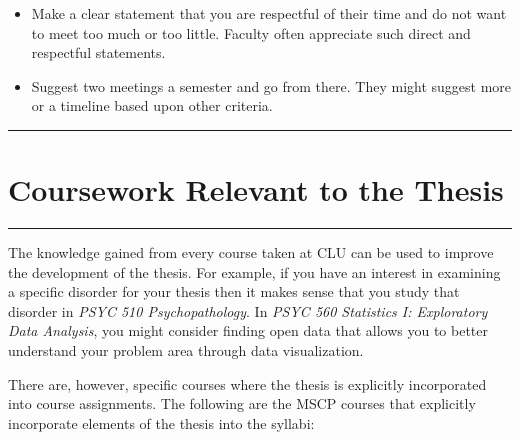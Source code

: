 \documentclass[openany]{book}
\begin{document}
\begin{itemize}
\item
  Make a clear statement that you are respectful of their time and do not want to meet too much or too little. Faculty often appreciate such direct and respectful statements.
\item
  Suggest two meetings a semester and go from there. They might suggest more or a timeline based upon other criteria.
\end{itemize}

\begin{center}\rule{0.5\linewidth}{0.5pt}\end{center}

\hypertarget{coursework-relevant-to-the-thesis}{%
\chapter{Coursework Relevant to the Thesis}\label{coursework-relevant-to-the-thesis}}

\begin{center}\rule{0.5\linewidth}{0.5pt}\end{center}

The knowledge gained from every course taken at CLU can be used to improve the development of the thesis. For example, if you have an interest in examining a specific disorder for your thesis then it makes sense that you study that disorder in \emph{PSYC 510 Psychopathology}. In \emph{PSYC 560 Statistics I: Exploratory Data Analysis}, you might consider finding open data that allows you to better understand your problem area through data visualization.

There are, however, specific courses where the thesis is explicitly incorporated into course assignments. The following are the MSCP courses that explicitly incorporate elements of the thesis into the syllabi:
\end{document}
